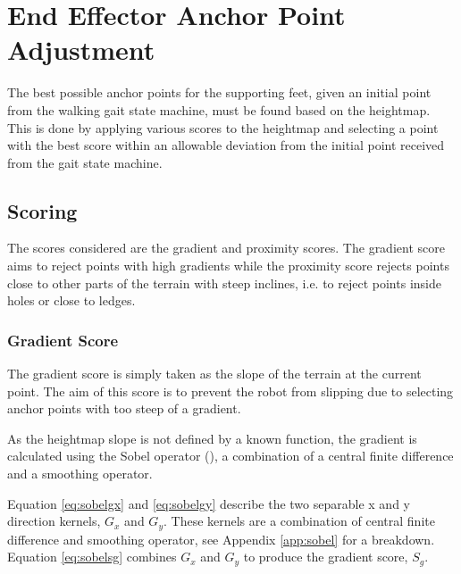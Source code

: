 \chapter{End Effector Anchor Point Adjustment} \label{chap:effector-placement}
The best possible anchor points for the supporting feet, given an initial point from the walking
gait state machine, must be found based on the heightmap. This is done by applying various
scores to the heightmap and selecting a point with the best score within an allowable
deviation from the initial point received from the gait state machine.

\section{Scoring}
    The scores considered are the gradient and proximity scores. The gradient score aims to reject points with high gradients while the proximity score rejects points close
    to other parts of the terrain with steep inclines, i.e. to reject points inside holes or close to ledges.
    \subsection{Gradient Score}
        The gradient score is simply taken as the slope of the terrain at the current point. The aim of this score is to prevent the robot from slipping due to
        selecting anchor points with too steep of a gradient.
        
        As the heightmap slope is not defined by a known function, the gradient is calculated using the Sobel
        operator (\cite{sobel2014}), a combination of a central finite difference and a smoothing operator.
        
        Equation \ref{eq:sobelgx} and \ref{eq:sobelgy} describe the two separable x and y direction kernels, \(G_x\) and \(G_y\). These kernels are a combination of
        central finite difference and smoothing operator, see Appendix \ref{app:sobel} for a breakdown. Equation \ref{eq:sobelsg} combines \(G_x\) and \(G_y\)
        to produce the gradient score, \(S_g\).

